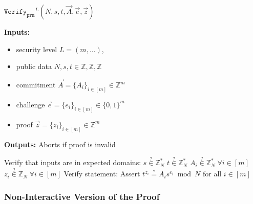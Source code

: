 \documentclass[11pt]{article}
\newenvironment{inlineAlgorithm}{}{}
\newcommand{\algoName}[1]{#1 \par}
\newcommand{\algoInputsList}[1]{
    {\small \bf Inputs:} 
        \begin{itemize}[noitemsep,topsep=0pt]
            #1
        \end{itemize}
}
\newcommand{\algoOutputs}[1]{
    {\small \bf Outputs:} #1 \par
}
\newcommand{\verify}[1]{\ensuremath{\mathtt{Verify}_{\mathtt{#1}}}}
\newcommand{\Z}{\mathbb{Z}}
\newcommand{\?}[1]{\stackrel{?}{#1}}
\newcommand{\Bit}{\ensuremath{\{0{,}1\}}}
\begin{document}
\begin{description}
\item
\begin{inlineAlgorithm}
\algoName{$\verify{prm}^L(N, s, t, \vec A, \vec e, \vec z)$}
\algoInputsList{
    \item security level $L = (m, \dots)$,
    \item public data $N, s, t \in \Z, \Z, \Z$
    \item commitment $\vec A = \{A_i\}_{i\in[m]} \in \Z^m$
    \item challenge $\vec e = \{e_i\}_{i\in[m]} \in \Bit^m$
    \item proof $\vec z = \{z_i\}_{i\in[m]} \in \Z^m$
}
\algoOutputs{Aborts if proof is invalid}
\begin{algorithmic}[1]
\Statex Verify that inputs are in expected domains:
\State $s \? \in \Z^*_N$
\State $t \? \in \Z^*_N$
\State $A_i \? \in \Z^*_N \; \forall i \in [m]$
\State $z_i \? \in \Z_N \; \forall i \in [m]$
\Statex Verify statement:
\State Assert $t^{z_i} \? = A_i s^{e_i} \bmod N$ for all $i \in [m]$
\end{algorithmic}
\end{inlineAlgorithm}

\end{description}


\subsubsection{Non-Interactive Version of the Proof}
\end{document}
